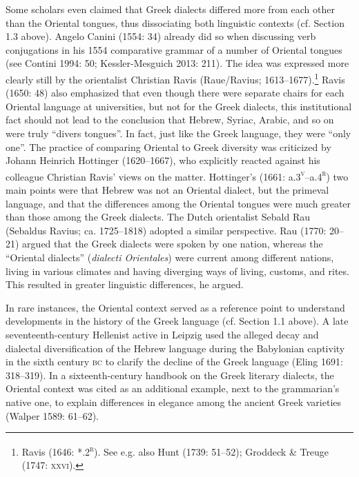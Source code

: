 \begin{styleStandard}
Some scholars even claimed that Greek dialects differed more from each other than the Oriental tongues, thus dissociating both linguistic contexts (cf. Section 1.3 above). Angelo Canini (1554: 34) already did so when discussing verb conjugations in his 1554 comparative grammar of a number of Oriental tongues (see Contini 1994: 50; Kessler-Mesguich 2013: 211). The idea was expressed more clearly still by the orientalist Christian Ravis (Raue/Ravius; 1613–1677).\footnote{ Ravis (1646: *.2\textsc{\textsuperscript{r}}). See e.g. also Hunt (1739: 51–52); Groddeck \& Treuge (1747: \textsc{xxvi}).} Ravis (1650: 48) also emphasized that even though there were separate chairs for each Oriental language at universities, but not for the Greek dialects, this institutional fact should not lead to the conclusion that Hebrew, Syriac, Arabic, and so on were truly “divers tongues”. In fact, just like the Greek language, they were “only one”. The practice of comparing Oriental to Greek diversity was criticized by Johann Heinrich Hottinger (1620–1667), who explicitly reacted against his colleague Christian Ravis’ views on the matter. Hottinger’s (1661: a.3\textsc{\textsuperscript{v}}–a.4\textsc{\textsuperscript{r}}) two main points were that Hebrew was not an Oriental dialect, but the primeval language, and that the differences among the Oriental tongues were much greater than those among the Greek dialects. The Dutch orientalist Sebald Rau (Sebaldus Ravius; ca. 1725–1818) adopted a similar perspective. Rau (1770: 20–21) argued that the Greek dialects were spoken by one nation, whereas the “Oriental dialects” (\textit{dialecti Orientales}) were current among different nations, living in various climates and having diverging ways of living, customs, and rites. This resulted in greater linguistic differences, he argued.
\end{styleStandard}

\begin{styleStandard}
In rare instances, the Oriental context served as a reference point to understand developments in the history of the Greek language (cf. Section 1.1 above). A late seventeenth-century Hellenist active in Leipzig used the alleged decay and dialectal diversification of the Hebrew language during the Babylonian captivity in the sixth century \textsc{bc} to clarify the decline of the Greek language (Eling 1691: 318–319). In a sixteenth-century handbook on the Greek literary dialects, the Oriental context was cited as an additional example, next to the grammarian’s native one, to explain differences in elegance among the ancient Greek varieties (Walper 1589: 61–62).
\end{styleStandard}

